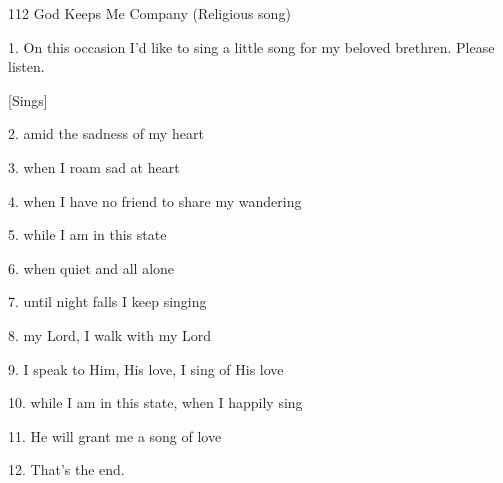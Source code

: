 
112 God Keeps Me Company (Religious song)

1. On this occasion I'd like to sing a little song for my beloved brethren. Please
listen.

[Sings]

2. amid the sadness of my heart

3. when I roam sad at heart

4. when I have no friend to share my wandering

5. while I am in this state

6. when quiet and all alone

7. until night falls I keep singing

8. my Lord, I walk with my Lord

9. I speak to Him, His love, I sing of His love

10. while I am in this state, when I happily sing

11. He will grant me a song of love

12. That's the end.



